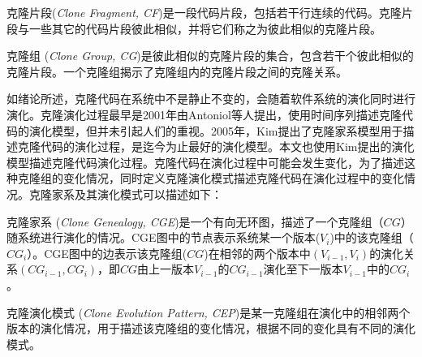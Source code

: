 \begin{definition} [{克隆片段}]
\label {defn-cf}
克隆片段({\em Clone Fragment, CF})是一段代码片段，包括若干行连续的代码。克隆片段与一些其它的代码片段彼此相似，并将它们称之为彼此相似的克隆片段。
\end {definition}

\begin{definition} [{克隆组}]
\label {defn-cg}
克隆组 ({\em Clone Group, CG})是彼此相似的克隆片段的集合，包含若干个彼此相似的克隆片段。一个克隆组揭示了克隆组内的克隆片段之间的克隆关系。
\end {definition}


如绪论所述，克隆代码在系统中不是静止不变的，会随着软件系统的演化同时进行演化。克隆演化过程最早是2001年由Antoniol等人提出，使用时间序列描述克隆代码的演化模型\cite{antoniol2001modeling}，但并未引起人们的重视。2005年，Kim提出了克隆家系模型用于描述克隆代码的演化过程，是迄今为止最好的演化模型\cite{kim2005empirical}。本文也使用Kim提出的演化模型描述克隆代码演化过程。克隆代码在演化过程中可能会发生变化，为了描述这种克隆组的变化情况，同时定义克隆演化模式描述克隆代码在演化过程中的变化情况。克隆家系及其演化模式可以描述如下：\\

\begin{definition} [{克隆家系}]
\label {defn-cg}
克隆家系 ({\em Clone Genealogy, CGE})是一个有向无环图，描述了一个克隆组（$CG$）随系统进行演化的情况。CGE图中的节点表示系统某一个版本($V_i$)中的该克隆组（$CG_i$）。CGE图中的边表示该克隆组($CG$)在相邻的两个版本中$(V_{i-1},V_i )$的演化关系$(CG_{i-1},CG_{i})$，即$CG$由上一版本$V_{i-1}$的$CG_{i-1}$演化至下一版本$V_{i-1}$中的$CG_{i}$。
\end{definition} 

\begin{definition} [{克隆演化模式}]
\label {defn-cep}
克隆演化模式 ({\em Clone Evolution Pattern, CEP})是某一克隆组在演化中的相邻两个版本的演化情况，用于描述该克隆组的变化情况，根据不同的变化具有不同的演化模式。
\end{definition} 

